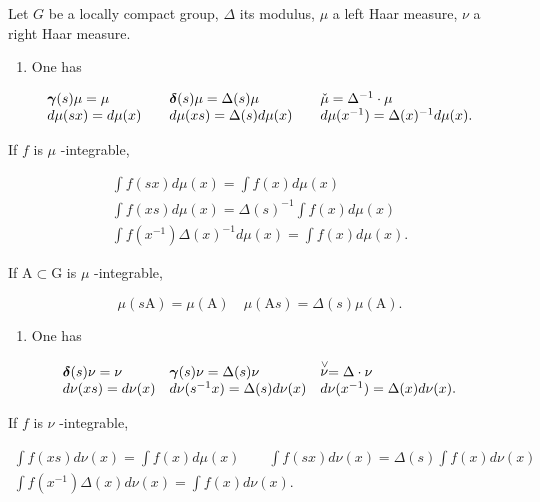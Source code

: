 
Let \(G\) be a locally compact group, \(\Delta\) its modulus, \(\mu\) a left Haar measure, \(\nu\) a right Haar measure.

\begin{enumerate}
\def\labelenumi{\arabic{enumi})}
\tightlist
\item
  One has
\end{enumerate}

\[
\begin{array}{l l l l} \boldsymbol {\gamma} (s) \mu = \mu & \quad \boldsymbol {\delta} (s) \mu = \Delta (s) \mu & \quad \check {\mu} = \Delta^ {- 1} \cdot \mu \\ d \mu (s x) = d \mu (x) & \quad d \mu (x s) = \Delta (s)   d \mu (x) & \quad d \mu (x ^ {- 1}) = \Delta (x) ^ {- 1}   d \mu (x). \end{array}
\]

If \(f\) is \(\mu\) -integrable,

\[
\begin{array}{c} \int f (s x) d \mu (x) = \int f (x) d \mu (x) \\ \int f (x s) d \mu (x) = \Delta (s) ^ {- 1} \int f (x) d \mu (x) \\ \int f (x ^ {- 1}) \Delta (x) ^ {- 1} d \mu (x) = \int f (x) d \mu (x). \end{array}
\]

If \(\mathrm{A}\subset \mathrm{G}\) is \(\mu\) -integrable,

\[
\mu (s \mathrm{A}) = \mu (\mathrm{A}) \quad \mu (\mathrm{A} s) = \Delta (s) \mu (\mathrm{A}).
\]

\begin{enumerate}
\def\labelenumi{\arabic{enumi})}
\setcounter{enumi}{1}
\tightlist
\item
  One has
\end{enumerate}

\[
\begin{array}{l l l l} \boldsymbol {\delta} (s) \nu = \nu & \boldsymbol {\gamma} (s) \nu = \Delta (s) \nu & \stackrel {{\vee}} {{\nu}} = \Delta \cdot \nu \\ d \nu (x s) = d \nu (x) & d \nu (s ^ {- 1} x) = \Delta (s)   d \nu (x) & d \nu (x ^ {- 1}) = \Delta (x)   d \nu (x). \end{array}
\]

If \(f\) is \(\nu\) -integrable,

\[
\begin{array}{c} \int f (x s) d \nu (x) = \int f (x) d \mu (x) \qquad \int f (s x) d \nu (x) = \Delta (s) \int f (x) d \nu (x) \\ \int f (x ^ {- 1}) \Delta (x) d \nu (x) = \int f (x) d \nu (x). \end{array}
\]

